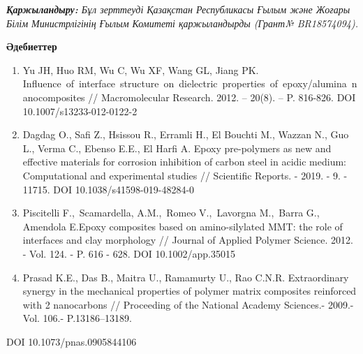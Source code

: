 \begin{multicols}{2}
\emph{{\bfseries Қаржыландыру:} Бұл зерттеуді Қазақстан Республикасы Ғылым
және Жоғары Білім Министрлігінің Ғылым Комитеті қаржыландырды (Грант№
BR18574094).}
\end{multicols}

\begin{center}
{\bfseries Әдебиеттер}
\end{center}

\begin{references}
\begin{enumerate}
\def\labelenumi{\arabic{enumi}.}
\item
  Yu JH, Huo RM, Wu C, Wu XF, Wang GL, Jiang PK.
  Influence~of~interface~structure~on~dielectric~properties~of~epoxy/alumina~nanocomposites
  // Macromolecular Research. 2012. -- 20(8). -- P. 816-826. DOI
  10.1007/s13233-012-0122-2
\item
  Dagdag O., Safi Z., Hsissou R., Erramli H., El Bouchti M., Wazzan N.,
  Guo L., Verma C., Ebenso E.E., El Harfi A. Epoxy pre-polymers as new
  and effective materials for corrosion inhibition of carbon steel in
  acidic medium: Computational and experimental studies // Scientific
  Reports. - 2019. - 9. - 11715. DOI 10.1038/s41598-019-48284-0
\item
  Piscitelli F.,~Scamardella, A.M.,~Romeo V.,~Lavorgna M.,~Barra G.,
  Amendola E.Epoxy composites based on amino-silylated MMT: the role of
  interfaces and clay morphology // Journal of Applied Polymer Science.
  2012. - Vol. 124. - P. 616 - 628. DOI 10.1002/app.35015
\item
  Prasad K.E., Das B., Maitra U., Ramamurty U., Rao C.N.R. Extraordinary
  synergy in the mechanical properties of polymer matrix composites
  reinforced with 2 nanocarbons // Proceeding of the National Academy
  Sciences.- 2009.- Vol. 106.- P.13186--13189.
\end{enumerate}

DOI 10.1073/pnas.0905844106


\end{references}

